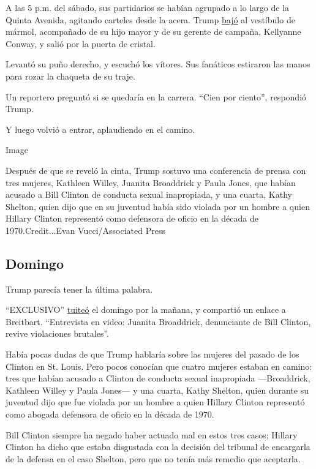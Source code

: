 A las 5 p.m. del sábado, sus partidarios se habían agrupado a lo largo
de la Quinta Avenida, agitando carteles desde la acera. Trump
\href{https://www.nytimes.com/2016/10/10/us/politics/trump-tower.html}{bajó}
al vestíbulo de mármol, acompañado de su hijo mayor y de su gerente de
campaña, Kellyanne Conway, y salió por la puerta de cristal.

Levantó su puño derecho, y escuchó los vítores. Sus fanáticos estiraron
las manos para rozar la chaqueta de su traje.

Un reportero preguntó si se quedaría en la carrera. ``Cien por ciento'',
respondió Trump.

Y luego volvió a entrar, aplaudiendo en el camino.

Image

Después de que se reveló la cinta, Trump sostuvo una conferencia de
prensa con tres mujeres, Kathleen Willey, Juanita Broaddrick y Paula
Jones, que habían acusado a Bill Clinton de conducta sexual inapropiada,
y una cuarta, Kathy Shelton, quien dijo que en su juventud había sido
violada por un hombre a quien Hillary Clinton representó como defensora
de oficio en la década de 1970.Credit...Evan Vucci/Associated Press

\hypertarget{domingo}{%
\subsection{Domingo}\label{domingo}}

Trump parecía tener la última palabra.

``EXCLUSIVO''
\href{https://twitter.com/realdonaldtrump/status/785106800572063744?lang=en}{tuiteó}
el domingo por la mañana, y compartió un enlace a Breitbart.
``Entrevista en video: Juanita Broaddrick, denunciante de Bill Clinton,
revive violaciones brutales''.

Había pocas dudas de que Trump hablaría sobre las mujeres del pasado de
los Clinton en St. Louis. Pero pocos conocían que cuatro mujeres estaban
en camino: tres que habían acusado a Clinton de conducta sexual
inapropiada ---Broaddrick, Kathleen Willey y Paula Jones--- y una
cuarta, Kathy Shelton, quien durante su juventud dijo que fue violada
por un hombre a quien Hillary Clinton representó como abogada defensora
de oficio en la década de 1970.

Bill Clinton siempre ha negado haber actuado mal en estos tres casos;
Hillary Clinton ha dicho que estaba disgustada con la decisión del
tribunal de encargarla de la defensa en el caso Shelton, pero que no
tenía más remedio que aceptarla.

